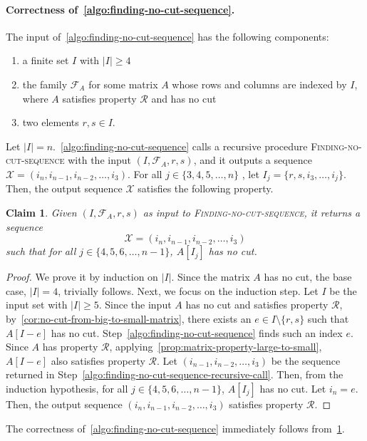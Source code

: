 \documentclass[11pt,letterpaper]{article}
\newtheorem{claim}{Claim}[section]
\newcommand{\prop}{\mathcal{R}}
\newcommand{\submatrixfamily}[1]{\mathcal{F}_{#1}}
\begin{document}
{{{\paragraph{Correctness of~\cref{algo:finding-no-cut-sequence}.}  The input of~\cref{algo:finding-no-cut-sequence} has the following components:
\begin{enumerate}
\item a finite set $I$ with $|I|\geq 4$
\item the family $\submatrixfamily{A}$ for some matrix $A$ whose rows and columns are indexed by $I$, where $A$ satisfies property $\prop$ and has no cut
\item two elements $r,s\in I$.
\end{enumerate}
Let $|I|=n$.~\cref{algo:finding-no-cut-sequence} calls a recursive procedure \textsc{Finding-no-cut-sequence} with the input $(I, \submatrixfamily{A}, r,s)$, and it outputs a sequence $\mathcal X= (i_{n}, i_{n-1}, i_{n-2}, \ldots, i_{3})$. For all $j\in\{3,4,5, \ldots, n\}$ , let $I_j=\{r, s, i_3, \ldots, i_j\}.$ Then, the output sequence $\mathcal X$ satisfies the following property.
\begin{claim}
\label{clm:correctness-of-finding-no-cut-sequence}
Given $(I, \submatrixfamily{A}, r,s)$ as input to \textsc{Finding-no-cut-sequence}, it returns a sequence $$\mathcal X=(i_{n}, i_{n-1}, i_{n-2}, \ldots, i_3)$$ such that for all $j\in\{4,5,6, \ldots, n-1\}$, $A[I_j]$ has no cut.
\end{claim}
\begin{proof}
We prove it by induction on $|I|$. Since the matrix $A$ has no cut, the base case, $|I|=4$, trivially follows. Next, we focus on the induction step. Let $I$ be  the input set with $|I|\geq 5$. Since the input $A$ has no cut and satisfies property $\prop$, by~\cref{cor:no-cut-from-big-to-small-matrix}, there exists an $e\in I\setminus\{r,s\}$ such that $A[I-e]$ has no cut. Step~\ref{algo:finding-no-cut-sequence} finds such an index $e$. Since $A$ has property $\prop$, applying~\cref{prop:matrix-property-large-to-small}, $A[I-e]$ also satisfies property $\prop$. Let $(i_{n-1}, i_{n-2}, \ldots, i_3)$ be the sequence returned in Step~\ref{algo:finding-no-cut-sequence-recursive-call}. Then, from the induction hypothesis, for all $j\in\{4,5, 6, \ldots, n-1\}$, $A[I_j]$ has no cut. Let $i_{n}=e$. Then, the output sequence $(i_n, i_{n-1}, i_{n-2}, \ldots, i_3)$ satisfies property $\prop$. 
\end{proof}
The correctness of~\cref{algo:finding-no-cut-sequence} immediately follows from~\cref{clm:correctness-of-finding-no-cut-sequence}.


}}}
\end{document}
